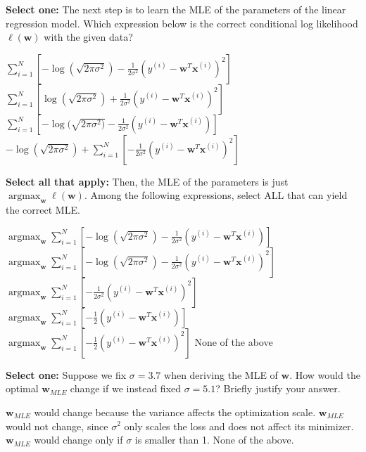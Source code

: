 \documentclass[11pt,addpoints,answers]{exam}
\newcommand \argmax {\operatorname*{argmax}}
\newcommand{\sall}{\textbf{Select all that apply: }}
\newcommand{\sone}{\textbf{Select one: }}
\begin{document}
\begin{questions}
\begin{parts}
\begin{subparts}
    
    \vspace{5mm}
    
    \subpart[2] \sone The next step is to learn the MLE of the parameters of the linear regression model. Which expression below is the correct conditional log likelihood $\ell(\mathbf{w})$ with the given data?
    \begin{checkboxes}
        \choice $\sum_{i=1}^{N} [-\log (\sqrt{2\pi\sigma^2}) - \frac{1}{2\sigma^2} (y^{(i)} - \mathbf{w}^T\mathbf{x}^{(i)})^2]$
        \choice $\sum_{i=1}^{N} [\log (\sqrt{2\pi\sigma^2}) + \frac{1}{2\sigma^2} (y^{(i)} - \mathbf{w}^T\mathbf{x}^{(i)})^2]$
        \choice $\sum_{i=1}^{N} [-\log(\sqrt{2\pi\sigma^2)} - \frac{1}{2\sigma^2} (y^{(i)} - \mathbf{w}^T\mathbf{x}^{(i)})]$
        \choice $-\log (\sqrt{2\pi\sigma^2}) + \sum_{i=1}^{N} [-\frac{1}{2\sigma^2} (y^{(i)} - \mathbf{w}^T\mathbf{x}^{(i)})^2]$
    \end{checkboxes}
    
    
    \vspace{5mm}
    
    \subpart[2] \sall Then, the MLE of the parameters is just  $\argmax_{\mathbf{w}} \ell(\mathbf{w})$. Among the following expressions, select ALL that can yield the correct MLE.
    {\checkboxchar{$\Box$} \checkedchar{$\blacksquare$}
    \begin{checkboxes}
        \choice $\argmax_{\mathbf{w}} \sum_{i=1}^{N} [-\log (\sqrt{2\pi\sigma^2}) - \frac{1}{2\sigma^2} (y^{(i)} - \mathbf{w}^T\mathbf{x}^{(i)})]$
        \choice $\argmax_{\mathbf{w}} \sum_{i=1}^{N} [-\log (\sqrt{2\pi\sigma^2}) - \frac{1}{2\sigma^2} (y^{(i)} - \mathbf{w}^T\mathbf{x}^{(i)})^2]$
        \choice $\argmax_{\mathbf{w}} \sum_{i=1}^{N} [- \frac{1}{2\sigma^2} (y^{(i)} - \mathbf{w}^T\mathbf{x}^{(i)})^2]$
        \choice $\argmax_{\mathbf{w}} \sum_{i=1}^{N} [- \frac{1}{2} (y^{(i)} - \mathbf{w}^T\mathbf{x}^{(i)})]$
        \choice $\argmax_{\mathbf{w}} \sum_{i=1}^{N} [- \frac{1}{2} (y^{(i)} - \mathbf{w}^T\mathbf{x}^{(i)})^2]$
        \choice None of the above
    \end{checkboxes}
    }

    \vspace{5mm}

    \subpart[1] \sone Suppose we fix $\sigma = 3.7$ when deriving the MLE of $\mathbf{w}$. 
    How would the optimal $\mathbf{w}_{MLE}$ change if we instead fixed $\sigma = 5.1$? 
    Briefly justify your answer.
    
    \begin{checkboxes}
        \choice $\mathbf{w}_{MLE}$ would change because the variance affects the optimization scale. 
        \choice $\mathbf{w}_{MLE}$ would not change, since $\sigma^2$ only scales the loss and does not affect its minimizer.
        \choice $\mathbf{w}_{MLE}$ would change only if $\sigma$ is smaller than 1.
        \choice None of the above.
    \end{checkboxes}
    

\end{subparts}
\end{parts}
\end{questions}
\end{document}
